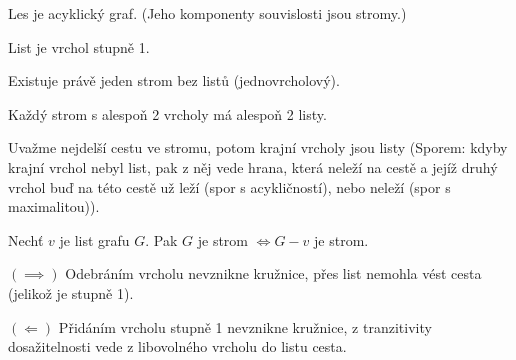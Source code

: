 \documentclass[12pt]{article}					%
\begin{document}
        \begin{definice}[Les]
            Les je acyklický graf. (Jeho komponenty souvislosti jsou stromy.)
        \end{definice}

        \begin{definice}[List]
            List je vrchol stupně 1.
        \end{definice}

        \begin{upozorneni}
            Existuje právě jeden strom bez listů (jednovrcholový).
        \end{upozorneni}

        \begin{lemma}
            Každý strom s alespoň 2 vrcholy má alespoň 2 listy.
            \begin{dukazin}
                Uvažme nejdelší cestu ve stromu, potom krajní vrcholy jsou listy (Sporem: kdyby krajní vrchol nebyl list, pak z něj vede hrana, která neleží na cestě a jejíž druhý vrchol buď na této cestě už leží (spor s acykličností), nebo neleží (spor s maximalitou)).
            \end{dukazin}
        \end{lemma}

        \begin{lemma}
            Nechť $v$ je list grafu $G$. Pak $G$ je strom $\Leftrightarrow G - v$ je strom.
            \begin{dukazin}
                $(\implies)$ Odebráním vrcholu nevznikne kružnice, přes list nemohla vést cesta (jelikož je stupně 1).

                $(\Leftarrow)$ Přidáním vrcholu stupně 1 nevznikne kružnice, z tranzitivity dosažitelnosti vede z libovolného vrcholu do listu cesta.
            \end{dukazin}
        \end{lemma}

\end{document}
